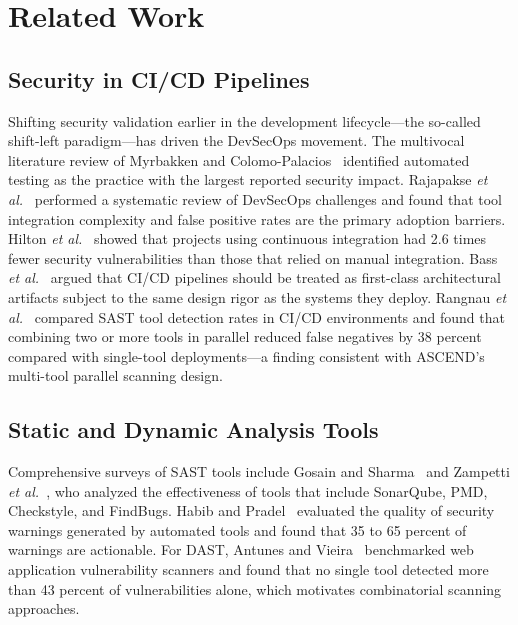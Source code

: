 \documentclass{ieeeaccess}
\begin{document}
\section{Related Work}
\label{sec:related}

\subsection{Security in CI/CD Pipelines}
Shifting security validation earlier in the development lifecycle---the so-called shift-left paradigm---has driven the DevSecOps movement. The multivocal literature review of Myrbakken and Colomo-Palacios~\cite{myrbakken2017devsecops} identified automated testing as the practice with the largest reported security impact. Rajapakse \emph{et al.}~\cite{rajapakse2022devsecops} performed a systematic review of DevSecOps challenges and found that tool integration complexity and false positive rates are the primary adoption barriers. Hilton \emph{et al.}~\cite{hilton2016usage} showed that projects using continuous integration had 2.6 times fewer security vulnerabilities than those that relied on manual integration. Bass \emph{et al.}~\cite{bass2015devops} argued that CI/CD pipelines should be treated as first-class architectural artifacts subject to the same design rigor as the systems they deploy. Rangnau \emph{et al.}~\cite{rangnau2020continuous} compared SAST tool detection rates in CI/CD environments and found that combining two or more tools in parallel reduced false negatives by 38 percent compared with single-tool deployments---a finding consistent with ASCEND's multi-tool parallel scanning design.

\subsection{Static and Dynamic Analysis Tools}
Comprehensive surveys of SAST tools include Gosain and Sharma~\cite{gosain2015survey} and Zampetti \emph{et al.}~\cite{zampetti2017open}, who analyzed the effectiveness of tools that include SonarQube, PMD, Checkstyle, and FindBugs. Habib and Pradel~\cite{habib2018how} evaluated the quality of security warnings generated by automated tools and found that 35 to 65 percent of warnings are actionable. For DAST, Antunes and Vieira~\cite{antunes2010comparing} benchmarked web application vulnerability scanners and found that no single tool detected more than 43 percent of vulnerabilities alone, which motivates combinatorial scanning approaches.
\end{document}
